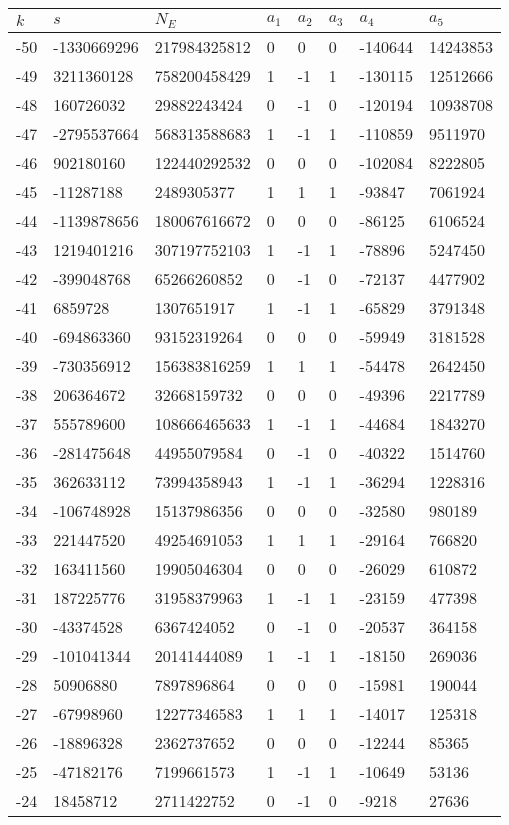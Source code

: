 \documentclass{amsart}
\begin{document}
\begin{longtable}{|l|l|l|lllll|}
\hline
$k$ & $s$ & $N_E$ & $a_1$ & $a_2$ & $a_3$ & $a_4$ & $a_5$\\
\hline
-50&-1330669296&217984325812&0&0&0&-140644&14243853\\
-49&3211360128&758200458429&1&-1&1&-130115&12512666\\
-48&160726032&29882243424&0&-1&0&-120194&10938708\\
-47&-2795537664&568313588683&1&-1&1&-110859&9511970\\
-46&902180160&122440292532&0&0&0&-102084&8222805\\
-45&-11287188&2489305377&1&1&1&-93847&7061924\\
-44&-1139878656&180067616672&0&0&0&-86125&6106524\\
-43&1219401216&307197752103&1&-1&1&-78896&5247450\\
-42&-399048768&65266260852&0&-1&0&-72137&4477902\\
-41&6859728&1307651917&1&-1&1&-65829&3791348\\
-40&-694863360&93152319264&0&0&0&-59949&3181528\\
-39&-730356912&156383816259&1&1&1&-54478&2642450\\
-38&206364672&32668159732&0&0&0&-49396&2217789\\
-37&555789600&108666465633&1&-1&1&-44684&1843270\\
-36&-281475648&44955079584&0&-1&0&-40322&1514760\\
-35&362633112&73994358943&1&-1&1&-36294&1228316\\
-34&-106748928&15137986356&0&0&0&-32580&980189\\
-33&221447520&49254691053&1&1&1&-29164&766820\\
-32&163411560&19905046304&0&0&0&-26029&610872\\
-31&187225776&31958379963&1&-1&1&-23159&477398\\
-30&-43374528&6367424052&0&-1&0&-20537&364158\\
-29&-101041344&20141444089&1&-1&1&-18150&269036\\
-28&50906880&7897896864&0&0&0&-15981&190044\\
-27&-67998960&12277346583&1&1&1&-14017&125318\\
-26&-18896328&2362737652&0&0&0&-12244&85365\\
-25&-47182176&7199661573&1&-1&1&-10649&53136\\
-24&18458712&2711422752&0&-1&0&-9218&27636\\

\end{longtable}
\end{document}
